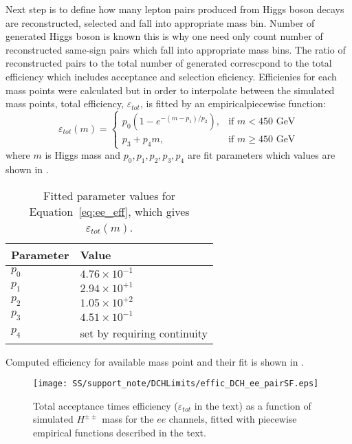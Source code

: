 Next step is to define how many lepton pairs produced from Higgs boson decays are reconstructed, selected and fall into appropriate mass bin.
Number of generated Higgs boson is known this is why one need only count number of reconstructed same-sign pairs which fall into appropriate mass bins.
The ratio of reconstructed pairs to the total number of generated correscpond to the total efficiency which includes acceptance and selection eficiency.
Efficienies for each mass points were calculated but in order to interpolate between the simulated mass points, total efficiency, $\varepsilon_{tot}$, is fitted by
an empiricalpiecewise function:
\begin{equation}
\varepsilon_{tot}(m) = \begin{cases} p_{0} (1-e^{-(m-p_{1})/p_{2}}), & \mbox{if } m < 450\mbox{ GeV} \\ 
p_{3} + p_{4} m, & \mbox{if } m \geq 450\mbox{ GeV} \end{cases}
\label{eq:ee_eff}
\end{equation}
where $m$ is Higgs mass and $p_{0}, p_{1}, p_{2}, p_{3}, p_{4}$ are fit parameters which values are shown in .
\begin{table}[htbp]
    \caption{Fitted parameter values for Equation~\ref{eq:ee_eff}, which gives $\varepsilon_{tot}(m)$.}
    \begin{center}
    \begin{tabular}{ l | l }
        \hline
        Parameter & Value \\
        \hline
        $p_{0}$    & $4.76 \times 10^{-1}$ \\[+0.05in]
        $p_{1}$    & $2.94 \times 10^{+1}$ \\[+0.05in]
        $p_{2}$    & $1.05 \times 10^{+2}$ \\[+0.05in]
        $p_{3}$    & $4.51 \times 10^{-1}$ \\[+0.05in]
        $p_{4}$    & set by requiring continuity \\[+0.05in]
        \hline
    \end{tabular}
    \end{center}
    \label{tab:ee_eff_params}
\end{table}

Computed efficiency for available mass point and their fit is shown in .

\begin{figure}[h]
\begin{center}
\texttt{[image: SS/support\_note/DCHLimits/effic\_DCH\_ee\_pairSF.eps]}
\caption{\toDo Total acceptance times efficiency ($\varepsilon_{tot}$ in the text) as a function of simulated $H^{\pm\pm}$ mass for the $ee$ channels, 
fitted with piecewise empirical functions described in the text.}
\label{fig:signal_efficiency}
\end{center}
\end{figure}

